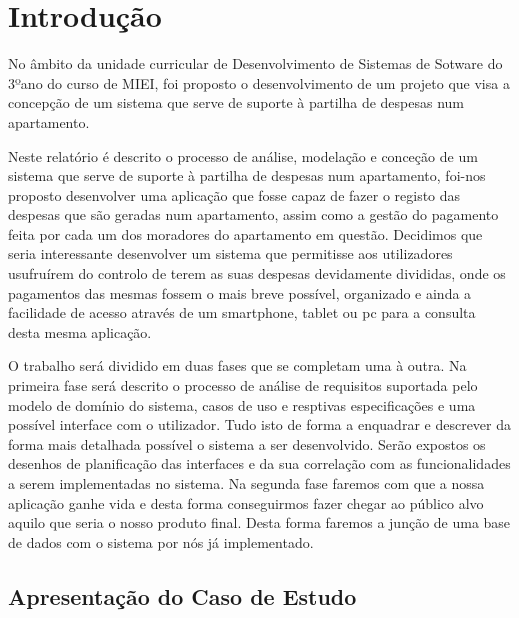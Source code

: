 \chapter{Introdução}

No âmbito da unidade curricular de Desenvolvimento de Sistemas de Sotware do 3ºano do curso de MIEI,  foi proposto o desenvolvimento de um projeto que visa a concepção de um sistema que serve de suporte à partilha de despesas num apartamento.

Neste relatório é descrito o processo de análise, modelação e conceção de um sistema que serve de suporte à partilha de despesas num apartamento, foi-nos proposto desenvolver uma aplicação que fosse capaz de fazer o registo das despesas que são geradas num apartamento, assim como a gestão do pagamento feita por cada um dos moradores do apartamento em questão.
Decidimos que seria interessante desenvolver um sistema que permitisse aos utilizadores usufruírem do controlo de terem as suas despesas devidamente divididas, onde os pagamentos das mesmas fossem o mais breve possível, organizado e ainda a facilidade de acesso através de um smartphone, tablet ou pc para a consulta desta mesma aplicação.

O trabalho será dividido em duas fases que se completam uma à outra.
Na primeira fase será descrito o processo de análise de requisitos suportada pelo modelo de domínio do sistema, casos de uso e resptivas especificações e uma possível interface com o utilizador. Tudo isto de forma a enquadrar e descrever da forma mais detalhada possível o sistema a ser desenvolvido. Serão expostos os desenhos de planificação das interfaces e da sua correlação com as funcionalidades a serem implementadas no sistema.
Na segunda fase faremos com que a nossa aplicação ganhe vida e desta forma conseguirmos fazer chegar ao público alvo aquilo que seria o nosso produto final. Desta forma faremos a junção de uma base de dados com o sistema por nós já implementado.

\section{Apresentação do Caso de Estudo}

